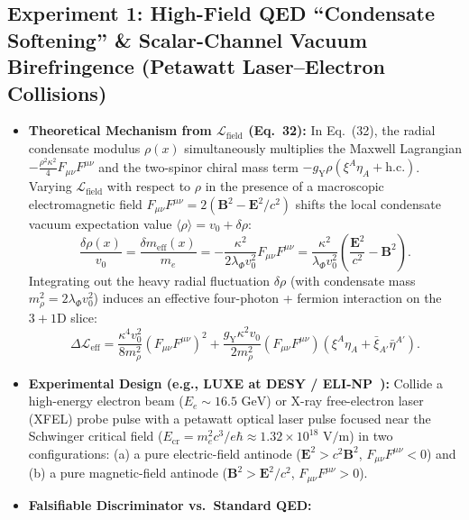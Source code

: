 \documentclass[11pt,a4paper]{article}
\begin{document}
\subsection{Experiment 1: High-Field QED ``Condensate Softening'' \& Scalar-Channel Vacuum Birefringence (Petawatt Laser--Electron Collisions)}
\begin{itemize}
    \item \textbf{Theoretical Mechanism from $\mathcal{L}_{\text{field}}$ (Eq.\ 32):}
    In Eq.\ (32), the radial condensate modulus $\rho(x)$ simultaneously multiplies the Maxwell Lagrangian $-\frac{\rho^2\kappa^2}{4}F_{\mu\nu}F^{\mu\nu}$ and the two-spinor chiral mass term $-g_{\text{Y}}\rho(\xi^A\eta_A + \text{h.c.})$. Varying $\mathcal{L}_{\text{field}}$ with respect to $\rho$ in the presence of a macroscopic electromagnetic field $F_{\mu\nu}F^{\mu\nu} = 2(\mathbf{B}^2 - \mathbf{E}^2/c^2)$ shifts the local condensate vacuum expectation value $\langle\rho\rangle = v_0 + \delta\rho$:
    \begin{equation}
    \frac{\delta \rho(x)}{v_0} = \frac{\delta m_{\text{eff}}(x)}{m_e} = -\frac{\kappa^2}{2\lambda_\Phi v_0^2} F_{\mu\nu}F^{\mu\nu} = \frac{\kappa^2}{\lambda_\Phi v_0^2}\left( \frac{\mathbf{E}^2}{c^2} - \mathbf{B}^2 \right).
    \end{equation}
    Integrating out the heavy radial fluctuation $\delta\rho$ (with condensate mass $m_\rho^2 = 2\lambda_\Phi v_0^2$) induces an effective four-photon + fermion interaction on the $3+1\text{D}$ slice:
    \begin{equation}
    \Delta \mathcal{L}_{\text{eff}} = \frac{\kappa^4 v_0^2}{8 m_\rho^2} \left( F_{\mu\nu}F^{\mu\nu} \right)^2 + \frac{g_{\text{Y}} \kappa^2 v_0}{2 m_\rho^2} \left( F_{\mu\nu}F^{\mu\nu} \right) \left( \xi^A \eta_A + \bar{\xi}_{A'}\bar{\eta}^{A'} \right).
    \end{equation}
    \item \textbf{Experimental Design (e.g., LUXE at DESY / ELI-NP~\cite{HeisenbergEuler1936}):}
    Collide a high-energy electron beam ($E_e \sim 16.5\text{ GeV}$) or X-ray free-electron laser (XFEL) probe pulse with a petawatt optical laser pulse focused near the Schwinger critical field ($E_{\text{cr}} = m_e^2 c^3 / e\hbar \approx 1.32 \times 10^{18}\text{ V/m}$) in two configurations: (a) a pure electric-field antinode ($\mathbf{E}^2 > c^2\mathbf{B}^2$, $F_{\mu\nu}F^{\mu\nu} < 0$) and (b) a pure magnetic-field antinode ($\mathbf{B}^2 > \mathbf{E}^2/c^2$, $F_{\mu\nu}F^{\mu\nu} > 0$).
    \item \textbf{Falsifiable Discriminator vs.\ Standard QED:}

\end{itemize}
\end{document}

